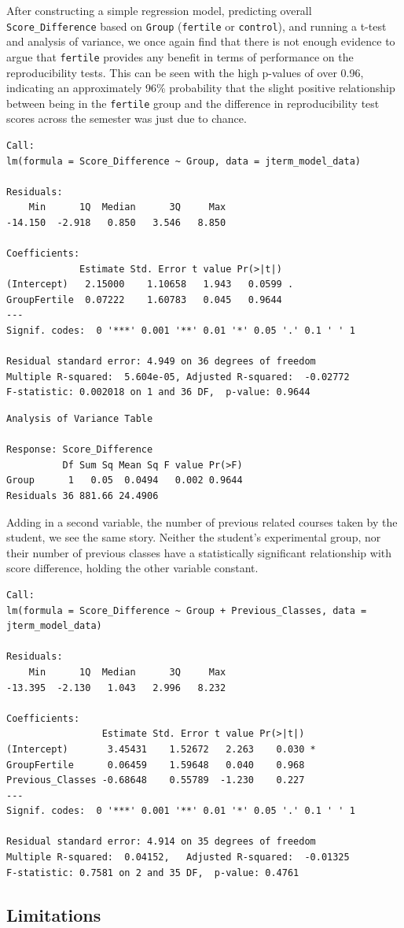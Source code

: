 \documentclass[12pt,twoside]{reedthesis}
\begin{document}
After constructing a simple regression model, predicting overall \texttt{Score\_Difference} based on \texttt{Group} (\texttt{fertile} or \texttt{control}), and running a t-test and analysis of variance, we once again find that there is not enough evidence to argue that \texttt{fertile} provides any benefit in terms of performance on the reproducibility tests. This can be seen with the high p-values of over 0.96, indicating an approximately 96\% probability that the slight positive relationship between being in the \texttt{fertile} group and the difference in reproducibility test scores across the semester was just due to chance.
\begin{verbatim}
Call:
lm(formula = Score_Difference ~ Group, data = jterm_model_data)

Residuals:
    Min      1Q  Median      3Q     Max 
-14.150  -2.918   0.850   3.546   8.850 

Coefficients:
             Estimate Std. Error t value Pr(>|t|)  
(Intercept)   2.15000    1.10658   1.943   0.0599 .
GroupFertile  0.07222    1.60783   0.045   0.9644  
---
Signif. codes:  0 '***' 0.001 '**' 0.01 '*' 0.05 '.' 0.1 ' ' 1

Residual standard error: 4.949 on 36 degrees of freedom
Multiple R-squared:  5.604e-05, Adjusted R-squared:  -0.02772 
F-statistic: 0.002018 on 1 and 36 DF,  p-value: 0.9644
\end{verbatim}
\begin{verbatim}
Analysis of Variance Table

Response: Score_Difference
          Df Sum Sq Mean Sq F value Pr(>F)
Group      1   0.05  0.0494   0.002 0.9644
Residuals 36 881.66 24.4906               
\end{verbatim}
Adding in a second variable, the number of previous related courses taken by the student, we see the same story. Neither the student's experimental group, nor their number of previous classes have a statistically significant relationship with score difference, holding the other variable constant.
\begin{verbatim}
Call:
lm(formula = Score_Difference ~ Group + Previous_Classes, data = jterm_model_data)

Residuals:
    Min      1Q  Median      3Q     Max 
-13.395  -2.130   1.043   2.996   8.232 

Coefficients:
                 Estimate Std. Error t value Pr(>|t|)  
(Intercept)       3.45431    1.52672   2.263    0.030 *
GroupFertile      0.06459    1.59648   0.040    0.968  
Previous_Classes -0.68648    0.55789  -1.230    0.227  
---
Signif. codes:  0 '***' 0.001 '**' 0.01 '*' 0.05 '.' 0.1 ' ' 1

Residual standard error: 4.914 on 35 degrees of freedom
Multiple R-squared:  0.04152,   Adjusted R-squared:  -0.01325 
F-statistic: 0.7581 on 2 and 35 DF,  p-value: 0.4761
\end{verbatim}
\hypertarget{limitations}{%
\subsection{Limitations}\label{limitations}}
\end{document}
